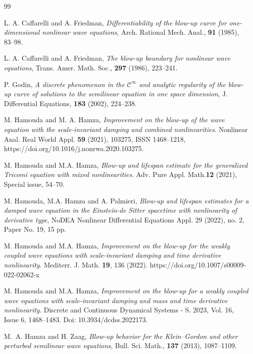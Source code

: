 \documentclass[
  sn-mathphys-num,
  colorlinks,
  linkcolor=darkmagenta,
  citecolor=rufous,
  urlcolor=zaffre,
  hypertexnames=false
]{sn-jnl}
\numberwithin{equation}{section}
\begin{document}
\begin{thebibliography}{99}

L. A. Caffarelli and A. Friedman, \textit{Differentiability of the blow-up curve for one-dimensional nonlinear wave equations}, Arch. Rational Mech. Anal., \textbf{91} (1985), 83–98.

L. A. Caffarelli and A. Friedman, \textit{The blow-up boundary for nonlinear wave equations}, Trans. Amer. Math. Soc., \textbf{297} (1986), 223–241.

P. Godin, \textit{A discrete phenomenon in the $\mathcal{C}^\infty$ and analytic regularity of the blow-up curve of solutions to the semilinear equation in one space dimension}, J. Differential Equations, \textbf{183} (2002), 224–238.

M. Hamouda and M. A. Hamza, {\it Improvement on the blow-up of the wave equation with the scale-invariant damping and combined nonlinearities}. Nonlinear Anal. Real World Appl. \textbf{59} (2021), 103275, ISSN 1468--1218, https://doi.org/10.1016/j.nonrwa.2020.103275.

{M. Hamouda and M.A. Hamza}, {\it  Blow-up and lifespan estimate for the generalized Tricomi equation with mixed nonlinearities}. {Adv. Pure Appl. Math.}{\bf 12} (2021), Special issue, 54--70.

{M. Hamouda, M.A. Hamza and A. Palmieri}, {\it  Blow-up and lifespan estimates for a damped wave equation in the Einstein-de Sitter spacetime with nonlinearity of derivative type}, NoDEA Nonlinear Differential Equations Appl. 29 (2022), no. 2, Paper No. 19, 15 pp.

{M. Hamouda and M.A. Hamza}, {\it  Improvement on the blow-up for  the weakly coupled wave equations  with  scale-invariant damping and time derivative nonlinearity}. Mediterr. J. Math. {\bf 19}, 136 (2022). https://doi.org/10.1007/s00009-022-02062-x

{M. Hamouda and M.A. Hamza}, {\it  Improvement on the blow-up for a weakly coupled wave equations with scale-invariant damping and mass and time derivative nonlinearity}. Discrete and Continuous Dynamical Systems - S. 2023, Vol. 16, Issue 6, 1468--1483. Doi: 10.3934/dcdss.2022173.

M.~A. Hamza and H. Zaag, \textit{Blow-up behavior for the Klein--Gordon and other perturbed semilinear wave equations}, Bull. Sci. Math., \textbf{137} (2013), 1087–1109.


\end{thebibliography}
\end{document}
